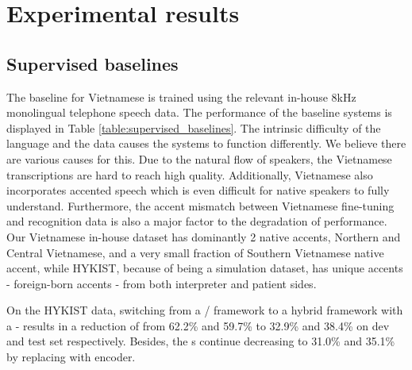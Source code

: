 \chapter{Experimental results}
\label{ch: Experimental_results}


\section{Supervised baselines}



The baseline for Vietnamese is trained using the relevant in-house 8kHz monolingual telephone speech data.
The performance of the baseline  systems is displayed in Table \ref{table:supervised_baselines}.
The intrinsic difficulty of the language and the data causes the systems to function differently.
We believe there are various causes for this.
Due to the natural flow of speakers, the Vietnamese transcriptions are hard to reach high quality.
Additionally, Vietnamese also incorporates accented speech which is even difficult for native speakers to fully understand. 
Furthermore, the accent mismatch between Vietnamese fine-tuning and recognition data is also a major factor to the degradation of performance.
Our Vietnamese in-house dataset has dominantly 2 native accents, Northern and Central Vietnamese, and a very small fraction of Southern Vietnamese native accent, while HYKIST, because of being a simulation dataset, has unique accents - foreign-born accents - from both interpreter and patient sides.

On the HYKIST data, switching from a / framework to a hybrid  framework with a - results in a reduction of  from 62.2\% and 59.7\% to 32.9\% and 38.4\% on dev and test set respectively.
Besides, the s continue decreasing to 31.0\% and 35.1\% by replacing  with   encoder.